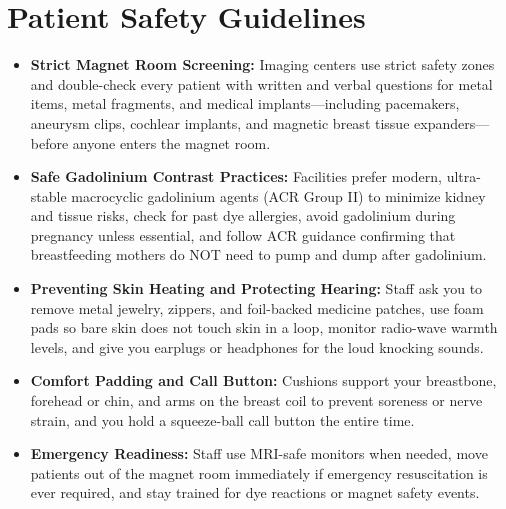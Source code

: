\section{Patient Safety Guidelines}
\begin{itemize}
\item \textbf{Strict Magnet Room Screening:} Imaging centers use strict safety zones and double-check every patient with written and verbal questions for metal items, metal fragments, and medical implants---including pacemakers, aneurysm clips, cochlear implants, and magnetic breast tissue expanders---before anyone enters the magnet room.
\item \textbf{Safe Gadolinium Contrast Practices:} Facilities prefer modern, ultra-stable macrocyclic gadolinium agents (ACR Group II) to minimize kidney and tissue risks, check for past dye allergies, avoid gadolinium during pregnancy unless essential, and follow ACR guidance confirming that breastfeeding mothers do NOT need to pump and dump after gadolinium.
\item \textbf{Preventing Skin Heating and Protecting Hearing:} Staff ask you to remove metal jewelry, zippers, and foil-backed medicine patches, use foam pads so bare skin does not touch skin in a loop, monitor radio-wave warmth levels, and give you earplugs or headphones for the loud knocking sounds.
\item \textbf{Comfort Padding and Call Button:} Cushions support your breastbone, forehead or chin, and arms on the breast coil to prevent soreness or nerve strain, and you hold a squeeze-ball call button the entire time.
\item \textbf{Emergency Readiness:} Staff use MRI-safe monitors when needed, move patients out of the magnet room immediately if emergency resuscitation is ever required, and stay trained for dye reactions or magnet safety events.
\end{itemize}

